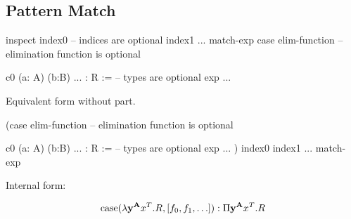 \vskip 5mm
\subsection{Pattern Match}

\begin{alba}
    inspect
        index0          -- indices are optional
        index1
        ...
        match-exp
    case
        {elim-function} -- elimination function is optional

        c0 (a: A) (b:B) ... : R := -- types are optional
            exp
        ...
\end{alba}

Equivalent form without  part.

\begin{alba}
    (case
        {elim-function} -- elimination function is optional

        c0 (a: A) (b:B) ... : R := -- types are optional
            exp
        ...
    ) index0 index1 ... match-exp
\end{alba}

Internal form:

$$
\text{case}(\lambda \mathbf{y}^{\mathbf{A}} x^T. R, [f_0, f_1, \ldots])
:
\Pi \mathbf{y}^{\mathbf{A}} x^T. R
$$
